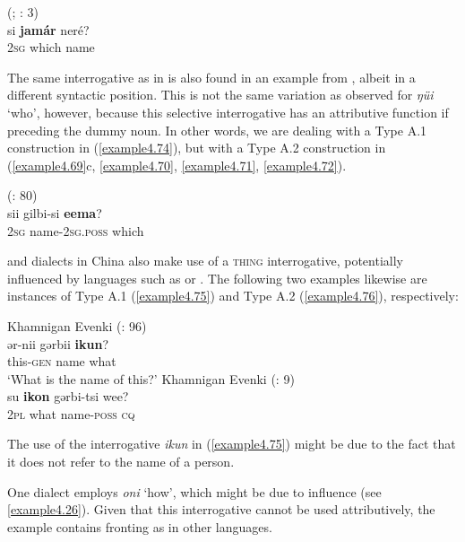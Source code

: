 \documentclass[output=paper,colorlinks,citecolor=brown]{langscibook}
\begin{document}
\ea
    \label{example4.73}
     (; \citealt{Ivanovskiy1982}: 3)\\
    \gll si		\textbf{jamár}	neré?\\
    2\textsc{sg}		which	name\\
    \z

The same interrogative as in  is also found in an example from , albeit in a different syntactic position. This is not the same variation as observed for \textit{ŋüi} ‘who’, however, because this selective interrogative has an attributive function if preceding the dummy noun. In other words, we are dealing with a Type A.1 construction in  (\ref{example4.74}), but with a Type A.2 construction in  (\ref{example4.69}c, \ref{example4.70}, \ref{example4.71}, \ref{example4.72}).

\ea
    \label{example4.74}
     (\citealt{Kazama2002}: 80)\\
    \gll sii		gilbi-si			\textbf{eema}?\\
    2\textsc{sg}		name-2\textsc{sg.poss}		which\\
    \z

 and  dialects in China also make use of a \textsc{thing} interrogative, potentially influenced by languages such as  or . The following two examples likewise are instances of Type A.1 (\ref{example4.75}) and Type A.2 (\ref{example4.76}), respectively:

\ea
    \label{example4.75}
    Khamnigan Evenki (\citealt{Tsumagari1992}: 96)\\
    \gll ər-nii	gərbii		\textbf{ikun}?\\
    this-\textsc{gen}	name		what\\
    \glt ‘What is the name of this?’
\ex
    \label{example4.76}
    Khamnigan Evenki (\citealt{ChaokeKajia2016H}: 9)\\
    \gll su			\textbf{ikon}	gərbi-tsi			wee?\\
    2\textsc{pl}		what		name-\textsc{poss}		\textsc{cq}\\
\z

\noindent The use of the interrogative \textit{ikun} in (\ref{example4.75}) might be due to the fact that it does not refer to the name of a person.

One  dialect employs \textit{oni} ‘how’, which might be due to  influence (see \ref{example4.26}). Given that this interrogative cannot be used attributively, the example contains fronting as in other  languages.
\end{document}
